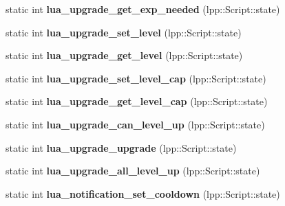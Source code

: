 \begin{DoxyCompactItemize}
\item 
static int {\bfseries lua\+\_\+upgrade\+\_\+get\+\_\+exp\+\_\+needed} (lpp\+::\+Script\+::state)\hypertarget{class_lua_interface_ad531cbb2eaf9d074d6ca87befce11ad7}{}\label{class_lua_interface_ad531cbb2eaf9d074d6ca87befce11ad7}

\item 
static int {\bfseries lua\+\_\+upgrade\+\_\+set\+\_\+level} (lpp\+::\+Script\+::state)\hypertarget{class_lua_interface_a28cb016d26ec6f2f1f4fcdbb1dd86a64}{}\label{class_lua_interface_a28cb016d26ec6f2f1f4fcdbb1dd86a64}

\item 
static int {\bfseries lua\+\_\+upgrade\+\_\+get\+\_\+level} (lpp\+::\+Script\+::state)\hypertarget{class_lua_interface_a7515970dc0b44403b98fd724873ef27b}{}\label{class_lua_interface_a7515970dc0b44403b98fd724873ef27b}

\item 
static int {\bfseries lua\+\_\+upgrade\+\_\+set\+\_\+level\+\_\+cap} (lpp\+::\+Script\+::state)\hypertarget{class_lua_interface_aede17ebdeae9177248b3bec997deed98}{}\label{class_lua_interface_aede17ebdeae9177248b3bec997deed98}

\item 
static int {\bfseries lua\+\_\+upgrade\+\_\+get\+\_\+level\+\_\+cap} (lpp\+::\+Script\+::state)\hypertarget{class_lua_interface_aa6e664faebad82d945754873ab779400}{}\label{class_lua_interface_aa6e664faebad82d945754873ab779400}

\item 
static int {\bfseries lua\+\_\+upgrade\+\_\+can\+\_\+level\+\_\+up} (lpp\+::\+Script\+::state)\hypertarget{class_lua_interface_ac76c8ce5e1aa39eb0ec5e9a77d2f34e7}{}\label{class_lua_interface_ac76c8ce5e1aa39eb0ec5e9a77d2f34e7}

\item 
static int {\bfseries lua\+\_\+upgrade\+\_\+upgrade} (lpp\+::\+Script\+::state)\hypertarget{class_lua_interface_aade9702647e974473c3a97fd72bf6303}{}\label{class_lua_interface_aade9702647e974473c3a97fd72bf6303}

\item 
static int {\bfseries lua\+\_\+upgrade\+\_\+all\+\_\+level\+\_\+up} (lpp\+::\+Script\+::state)\hypertarget{class_lua_interface_ae73455fe17eae26007e682241d6fb689}{}\label{class_lua_interface_ae73455fe17eae26007e682241d6fb689}

\item 
static int {\bfseries lua\+\_\+notification\+\_\+set\+\_\+cooldown} (lpp\+::\+Script\+::state)\hypertarget{class_lua_interface_a028cbc1d878224f785ac9436aac9506e}{}\label{class_lua_interface_a028cbc1d878224f785ac9436aac9506e}


\end{DoxyCompactItemize}
